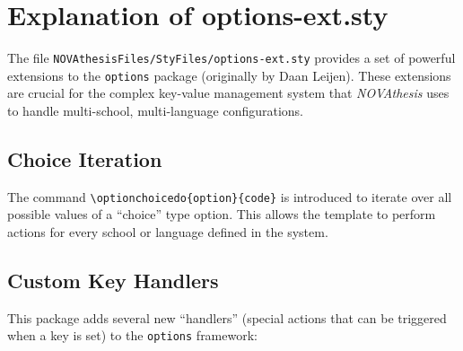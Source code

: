 

\chapter{Explanation of options-ext.sty}
\label{annex:options-ext}

The file \texttt{NOVAthesisFiles/StyFiles/options-ext.sty} provides a set of powerful extensions to the \texttt{options} package (originally by Daan Leijen). These extensions are crucial for the complex key-value management system that \emph{NOVAthesis} uses to handle multi-school, multi-language configurations.

\section{Choice Iteration}
The command \texttt{\textbackslash optionchoicedo\{option\}\{code\}} is introduced to iterate over all possible values of a ``choice'' type option. This allows the template to perform actions for every school or language defined in the system.

\section{Custom Key Handlers}
This package adds several new ``handlers'' (special actions that can be triggered when a key is set) to the \texttt{options} framework:

